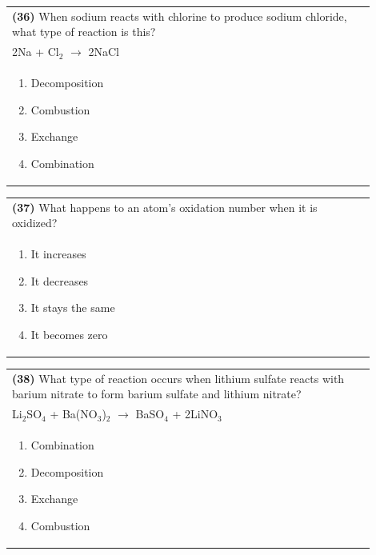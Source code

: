 \documentclass{article}
\begin{document}
\noindent\begin{tabular}{|p{0.9\linewidth}|}
\hline
\textbf{(36)} When sodium reacts with chlorine to produce sodium chloride, what type of reaction is this?\\[0.2cm]
2Na + Cl$_2$ $\rightarrow$ 2NaCl\\[0.2cm]
\begin{minipage}[t]{0.85\linewidth}
\begin{enumerate}[label=\alph*.]
\item Decomposition
\item Combustion
\item Exchange
\item Combination
\end{enumerate}
\end{minipage}\\[0.2cm]
\hline
\end{tabular}
\newpage

\noindent\begin{tabular}{|p{0.9\linewidth}|}
\hline
\textbf{(37)} What happens to an atom's oxidation number when it is oxidized?\\[0.2cm]
\begin{minipage}[t]{0.85\linewidth}
\begin{enumerate}[label=\alph*.]
\item It increases
\item It decreases
\item It stays the same
\item It becomes zero
\end{enumerate}
\end{minipage}\\[0.2cm]
\hline
\end{tabular}

\noindent\begin{tabular}{|p{0.9\linewidth}|}
\hline
\textbf{(38)} What type of reaction occurs when lithium sulfate reacts with barium nitrate to form barium sulfate and lithium nitrate?\\[0.2cm]
Li$_2$SO$_4$ + Ba(NO$_3$)$_2$ $\rightarrow$ BaSO$_4$ + 2LiNO$_3$\\[0.2cm]
\begin{minipage}[t]{0.85\linewidth}
\begin{enumerate}[label=\alph*.]
\item Combination
\item Decomposition
\item Exchange
\item Combustion
\end{enumerate}
\end{minipage}\\[0.2cm]
\hline
\end{tabular}
\end{document}
